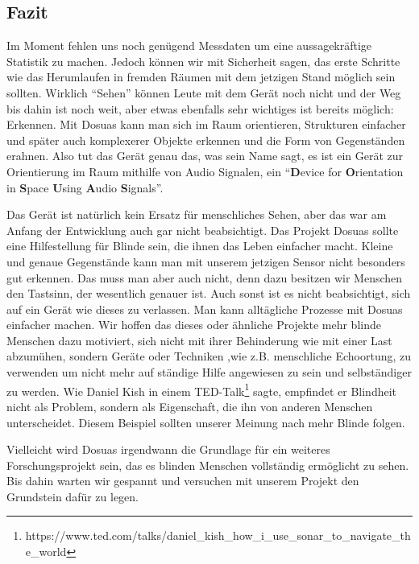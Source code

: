\documentclass[a4paper,12pt,ngerman]{scrartcl}
\begin{document}
\subsection{Fazit}

Im Moment fehlen uns noch genügend Messdaten um eine aussagekräftige Statistik zu machen. Jedoch
können wir mit Sicherheit sagen, das erste Schritte wie das Herumlaufen in fremden Räumen mit
dem jetzigen Stand möglich sein sollten. Wirklich \enquote{Sehen} können Leute mit dem Gerät
noch nicht und der Weg bis dahin ist noch weit, aber etwas ebenfalls sehr wichtiges
ist bereits möglich: Erkennen. Mit Dosuas kann man sich im Raum orientieren, Strukturen einfacher und später auch komplexerer Objekte erkennen und die Form von Gegenständen erahnen. Also tut das Gerät genau das, was sein Name sagt, es ist ein Gerät zur Orientierung im Raum mithilfe von Audio
Signalen, ein \enquote{\textbf{D}evice for \textbf{O}rientation in \textbf{S}pace \textbf{U}sing 
	\textbf{A}udio \textbf{S}ignals}.\par 
Das Gerät ist natürlich kein Ersatz für menschliches Sehen, aber das war am Anfang der Entwicklung
auch gar nicht beabsichtigt. Das Projekt Dosuas sollte eine Hilfestellung für Blinde sein, die ihnen das Leben einfacher macht. Kleine und genaue Gegenstände kann man mit unserem jetzigen Sensor nicht besonders gut erkennen. Das muss man aber auch nicht, denn dazu besitzen wir Menschen den Tastsinn, der wesentlich genauer ist. Auch sonst ist es nicht beabsichtigt, sich auf 
ein Gerät wie dieses zu verlassen. Man kann alltägliche Prozesse mit Dosuas einfacher machen. 
Wir hoffen das dieses oder ähnliche Projekte mehr blinde Menschen dazu motiviert, sich nicht 
mit ihrer Behinderung wie mit einer Last abzumühen, sondern Geräte oder Techniken
,wie z.B. menschliche Echoortung, zu verwenden um nicht mehr auf ständige Hilfe angewiesen 
zu sein und selbständiger zu werden. Wie Daniel Kish in einem TED-Talk\footnote{https://www.ted.com/talks/daniel\_kish\_how\_i\_use\_sonar\_to\_navigate\_the\_world} sagte, 
empfindet er Blindheit nicht als Problem, sondern als Eigenschaft, die ihn von anderen Menschen
unterscheidet. Diesem Beispiel sollten unserer Meinung nach mehr Blinde folgen.\par 
Vielleicht wird Dosuas irgendwann die Grundlage für ein weiteres
Forschungsprojekt sein, das es blinden Menschen vollständig ermöglicht zu sehen. Bis dahin
warten wir gespannt und versuchen mit unserem Projekt den Grundstein dafür zu legen. 

\newpage
\end{document}
